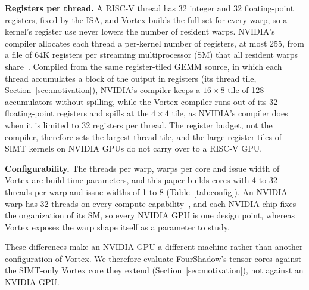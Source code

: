 \textbf{Registers per thread.} A RISC-V thread has 32 integer and 32 floating-point registers, fixed by the ISA, and Vortex builds the full set for every warp, so a kernel's register use never lowers the number of resident warps. NVIDIA's compiler allocates each thread a per-kernel number of registers, at most 255, from a file of 64K registers per streaming multiprocessor (SM) that all resident warps share~\cite{nvidia2026cudaguide}. Compiled from the same register-tiled GEMM source, in which each thread accumulates a block of the output in registers (its thread tile, Section~\ref{sec:motivation}), NVIDIA's compiler keeps a $16{\times}8$ tile of 128 accumulators without spilling, while the Vortex compiler runs out of its 32 floating-point registers and spills at the $4{\times}4$ tile, as NVIDIA's compiler does when it is limited to 32 registers per thread. The register budget, not the compiler, therefore sets the largest thread tile, and the large register tiles of SIMT kernels on NVIDIA GPUs do not carry over to a RISC-V GPU.

\textbf{Configurability.} The threads per warp, warps per core and issue width of Vortex are build-time parameters, and this paper builds cores with 4 to 32 threads per warp and issue widths of 1 to 8 (Table~\ref{tab:config}). An NVIDIA warp has 32 threads on every compute capability~\cite{nvidia2026cudaguide}, and each NVIDIA chip fixes the organization of its SM, so every NVIDIA GPU is one design point, whereas Vortex exposes the warp shape itself as a parameter to study.

These differences make an NVIDIA GPU a different machine rather than another configuration of Vortex. We therefore evaluate FourShadow's tensor cores against the SIMT-only Vortex core they extend (Section~\ref{sec:motivation}), not against an NVIDIA GPU.
